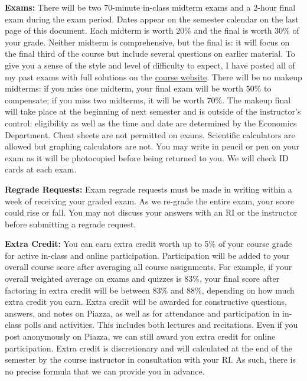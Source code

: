 \documentclass[11pt, letterpaper]{article}
\begin{document}
\noindent \textbf{Exams:} 
There will be two 70-minute in-class midterm exams and a 2-hour final exam during the exam period.
Dates appear on the semester calendar on the last page of this document. 
Each midterm is worth 20\% and the final is worth 30\% of your grade.
Neither midterm is comprehensive, but the final is: it will focus on the final third of the course but include several questions on earlier material.
To give you a sense of the style and level of difficulty to expect, I have posted all of my past exams with full solutions on the \href{http://ditraglia.com/Econ103Public}{course website}.
There will be no makeup midterms: if you miss one midterm, your final exam will be worth 50\% to compensate; if you miss two midterms, it will be worth 70\%.
The makeup final will take place at the beginning of next semester and is outside of the instructor's control: eligibility as well as the time and date are determined by the Economics Department. 
Cheat sheets are not permitted on exams.
Scientific calculators are allowed but graphing calculators are not. 
You may write in pencil or pen on your exam as it will be photocopied before being returned to you.
We will check ID cards at each exam.

\medskip

\noindent \textbf{Regrade Requests:}
Exam regrade requests must be made in writing within a week of receiving your graded exam. 
As we re-grade the entire exam, your score could rise or fall. 
You may not discuss your answers with an RI or the instructor before submitting a regrade request. 


\medskip

\noindent \textbf{Extra Credit:} 
You can earn extra credit worth up to 5\% of your course grade for active in-class and online participation. 
Participation will be added to your overall course score after averaging all course assignments.
For example, if your overall weighted average on exams and quizzes is 83\%, your final score after factoring in extra credit will be between 83\% and 88\%, depending on how much extra credit you earn. 
Extra credit will be awarded for constructive questions, answers, and notes on Piazza, as well as for attendance and participation in in-class polls and activities.
This includes both lectures and recitations.
Even if you post anonymously on Piazza, we can still award you extra credit for online participation.
Extra credit is discretionary and will calculated at the end of the semester by the course instructor in consultation with your RI.
As such, there is no precise formula that we can provide you in advance.
\end{document}

